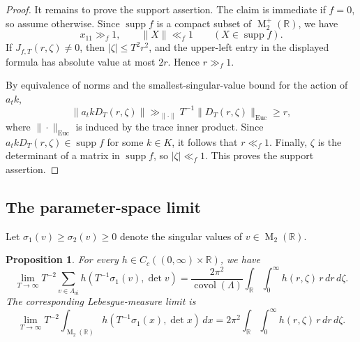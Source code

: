 \documentclass[reqno,11pt]{amsart}
\newtheorem{prop}[prop]{Proposition}
\theoremstyle{definition}
\theoremstyle{remark}
\numberwithin{equation}{section}
\newcommand{\M}{\operatorname{M}}
\newcommand{\covol}{\operatorname{covol}}
\newcommand{\supp}{\operatorname{supp}}
\begin{document}
\begin{proof}
It remains to prove the support assertion. The claim is immediate if
$f=0$, so assume otherwise. Since $\supp f$ is a compact subset of
$\M_2^+(\mathbb R)$, we have
$$
x_{11}\gg_f1,
\qquad
\|X\|\ll_f1
\qquad(X\in\supp f).
$$
If $J_{f,T}(r,\zeta)\ne0$, then $|\zeta|\le T^2r^2$, and the upper-left
entry in the displayed formula has absolute value at most $2r$. Hence
$r\gg_f1$.

By equivalence of norms and the smallest-singular-value bound for the
action of $a_tk$,
$$
\|a_tkD_T(r,\zeta)\|
\gg_{\|\cdot\|}
T^{-1}\|D_T(r,\zeta)\|_{\operatorname{Euc}}
\ge r,
$$
where $\|\cdot\|_{\operatorname{Euc}}$ is induced by the trace inner
product. Since $a_tkD_T(r,\zeta)\in\supp f$ for some $k\in K$, it follows
that $r\ll_f1$. Finally, $\zeta$ is the determinant of a matrix in
$\supp f$, so $|\zeta|\ll_f1$. This proves the support assertion.
\end{proof}

\subsection{The parameter-space limit}

Let $\sigma_1(v)\ge\sigma_2(v)\ge0$ denote the singular values of $v\in \M_2(\mathbb R)$.

\begin{prop}
\label{prop:parameter-limit-d2}
For every $h\in C_c((0,\infty)\times\mathbb R)$, we have
\begin{equation}\label{eq:parameter-limit-d2}
\lim_{T\to\infty}
T^{-2}
\sum_{v\in\Lambda_{\operatorname{ni}}}
h\left(T^{-1}\sigma_1(v),\det v\right)
=
\frac{2\pi^2}{\covol(\Lambda)}
\int_{\mathbb R}\int_0^\infty
h(r,\zeta)\,r\,dr\,d\zeta.
\end{equation}
The corresponding Lebesgue-measure limit is
$$
\lim_{T\to\infty}
T^{-2}
\int_{\M_2(\mathbb R)}
h\left(T^{-1}\sigma_1(x),\det x\right)\,dx
=
2\pi^2
\int_{\mathbb R}\int_0^\infty
h(r,\zeta)\,r\,dr\,d\zeta.
$$
\end{prop}
\end{document}
